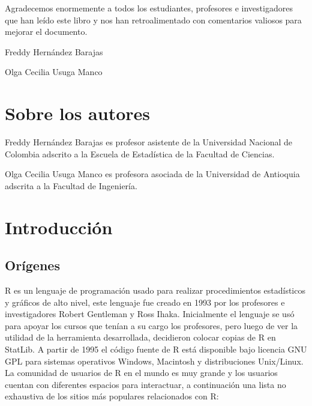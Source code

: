 \documentclass[10pt,]{krantz}
\let\proglang=\textsf
\let\BeginKnitrBlock\begin \let\EndKnitrBlock\end
\begin{document}
Agradecemos enormemente a todos los estudiantes, profesores e
investigadores que han leído este libro y nos han retroalimentado con
comentarios valiosos para mejorar el documento.

\BeginKnitrBlock{flushright}
Freddy Hernández Barajas

Olga Cecilia Usuga Manco
\EndKnitrBlock{flushright}

\chapter*{Sobre los autores}\label{sobre-los-autores}


Freddy Hernández Barajas es profesor asistente de la Universidad
Nacional de Colombia adscrito a la Escuela de Estadística de la Facultad
de Ciencias.

Olga Cecilia Usuga Manco es profesora asociada de la Universidad de
Antioquia adscrita a la Facultad de Ingeniería.

\mainmatter

\chapter{Introducción}\label{introduccion}

\section{Orígenes} \label{sec:origenes}

\proglang{R} es un lenguaje de programación usado para realizar
procedimientos estadísticos y gráficos de alto nivel, este lenguaje fue
creado en 1993 por los profesores e investigadores Robert Gentleman y
Ross Ihaka. Inicialmente el lenguaje se usó para apoyar los cursos que
tenían a su cargo los profesores, pero luego de ver la utilidad de la
herramienta desarrollada, decidieron colocar copias de \proglang{R} en
StatLib. A partir de 1995 el código fuente de \proglang{R} está
disponible bajo licencia GNU GPL para sistemas operativos Windows,
Macintosh y distribuciones Unix/Linux. La comunidad de usuarios de
\proglang{R} en el mundo es muy grande y los usuarios cuentan con
diferentes espacios para interactuar, a continuación una lista no
exhaustiva de los sitios más populares relacionados con \proglang{R}:
\end{document}
